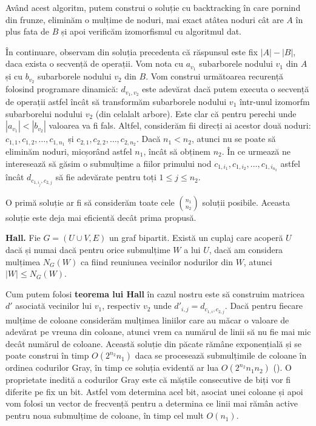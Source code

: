 Având acest algoritm, putem construi o soluție cu backtracking în care pornind din frunze, eliminăm o mulțime de noduri, mai exact atâtea
noduri cât are $A$ în plus fata de $B$ și apoi verificăm izomorfismul cu algoritmul dat.

În continuare, observam din soluția precedenta că răspunsul este fix $|A| - |B|$, daca exista o secvență de operații. Vom nota cu $a_{v_{1}}$
subarborele nodului $v_{1}$ din $A$ și cu $b_{v_{2}}$ subarborele nodului $v_{2}$ din $B$. Vom construi următoarea recurență folosind
programare dinamică: $d_{v_{1}, v_{2}}$ este adevărat dacă putem executa o secvență de operații astfel încât să transformăm subarborele
nodului $v_{1}$ într-unul izomorfm subarborelui nodului $v_{2}$ (din celalalt arbore). Este clar că pentru perechi unde $|a_{v_{1}}| < |b_{v_{2}}|$ valoarea va fi fals. Altfel, considerăm fii direcți ai acestor două noduri: $c_{1, 1}, c_{1, 2}, \ldots, c_{1, n_{1}}$ și $c_{2, 1}, c_{2, 2}, \ldots, c_{2, n_{2}}$.
Dacă $n_{1} < n_{2}$, atunci nu se poate să eliminăm noduri, micșorând astfel $n_{1}$, încât să obținem $n_{2}$. În ce urmează ne interesează să găsim o
submulțime a fiilor primului nod $c_{1, i_{1}}, c_{1, i_{2}}, \ldots, c_{1, i_{n_{2}}}$ astfel încât $d_{c_{1, i_{j}}, c_{2, j}}$ să fie adevărate
pentru toți $1 \leq j \leq n_{2}$.

O primă soluție ar fi să considerăm toate cele $\binom{n_{1}}{n_{2}}$ soluții posibile. Aceasta soluție este deja mai eficientă decât prima propusă.

\begin{thm}
  \label{hall}
  \textbf{Hall.} Fie $G = (U \cup V, E)$ un graf bipartit. Există un cuplaj care acoperă $U$ dacă și numai dacă pentru orice submulțime $W$
  a lui $U$, dacă am considera mulțimea $N_{G}(W)$ ca fiind reuniunea vecinilor nodurilor din $W$, atunci $|W| \leq N_{G}(W)$.
\end{thm}

Cum putem folosi \textbf{teorema lui Hall} în cazul nostru este să construim matricea $d'$ asociată vecinilor lui $v_{1}$, respectiv $v_{2}$
unde $d'_{i, j} = d_{c_{1, i}, c_{2, j}}$. Dacă pentru fiecare mulțime de coloane considerăm mulțimea liniilor care au măcar o valoare de adevărat
pe vreuna din coloane, atunci vrem ca numărul de linii să nu fie mai mic decât numărul de coloane. Această soluție din păcate rămâne exponențială
și se poate construi în timp $O(2^{n_{2}} n_{1})$ daca se procesează submulțimile de coloane în ordinea codurilor Gray, în timp ce soluția evidentă ar lua
$O(2^{n_{2}} n_{1}n_{2})$ (\cite{gray}). O proprietate inedită a codurilor Gray este că măștile consecutive de biți vor fi diferite pe fix un bit. Astfel vom determina acel bit,
asociat unei coloane și apoi vom folosi un vector de frecvență pentru a determina ce linii mai rămân active pentru noua submulțime de coloane, în timp
cel mult $O(n_{1})$.

